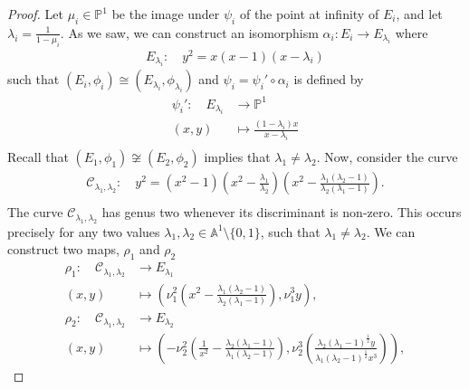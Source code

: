 \documentclass{amsart}
\newcommand{\calC}{\mathcal{C}}
\numberwithin{equation}{section}
\theoremstyle{definition}
\theoremstyle{remark}
\begin{document}
\begin{proof}
Let $\mu_i\in\mathbb{P}^1$ be the image under $\psi_i$ of the point at infinity of $E_i$, and let $\lambda_i=\tfrac{1}{1-\mu_i}$. As we saw, we can construct an isomorphism $\alpha_i:E_i\rightarrow E_{\lambda_i}$ where
\begin{align*}
 E_{\lambda_i}\colon\quad y^2=x(x-1)(x-\lambda_i)
\end{align*}
such that $(E_i,\phi_i)\cong(E_{\lambda_i},\phi_{\lambda_i})$ and $\psi_i=\psi_i'\circ\alpha_i$ is defined by
\begin{align*}
\psi_i'\colon\quad E_{\lambda_i}&\longrightarrow\mathbb{P}^1\\
(x,y)&\longmapsto\frac{(1-\lambda_i)x}{x-\lambda_i}\\
\end{align*}
Recall that $(E_1,\phi_1)\not\cong(E_2,\phi_2)$ implies that $\lambda_1\neq\lambda_2$. Now, consider the curve
\begin{align*}
\calC_{\lambda_1,\lambda_2}\colon\quad y^2=(x^2-1)\left(x^2-\frac{\lambda_1}{\lambda_2}\right)\left(x^2-\frac{\lambda_1(\lambda_2-1)}{\lambda_2(\lambda_1-1)}\right).\\
\end{align*}
The curve $\calC_{\lambda_1,\lambda_2}$ has genus two whenever its discriminant is non-zero. This occurs precisely for any two values $\lambda_1,\lambda_2\in \mathbb{A}^1\setminus\{0,1\}$, such that $\lambda_1\neq\lambda_2$. We can construct two maps, $\rho_1$ and $\rho_2$
\begin{align*}
\rho_1\colon\quad \calC_{\lambda_1,\lambda_2} &\longrightarrow E_{\lambda_1} \\
(x,y) &\longmapsto\left(\nu_1^2\left(x^2-\frac{\lambda_1(\lambda_2-1)}{\lambda_2(\lambda_1-1)}\right),\nu_1^3 y\right),\\
\rho_2\colon\quad \calC_{\lambda_1,\lambda_2} &\longrightarrow E_{\lambda_2} \\
(x,y) &\longmapsto\left(-\nu_2^2\left(\frac{1}{x^2}-\frac{\lambda_2(\lambda_1-1)}{\lambda_1(\lambda_2-1)}\right),\nu_2^3\left( \frac{\lambda_2(\lambda_1-1)^{\frac{1}{2}}y}{\lambda_1(\lambda_2-1)^{\frac{1}{2}}x^3}\right)\right),
\end{align*}


\end{proof}
\end{document}
